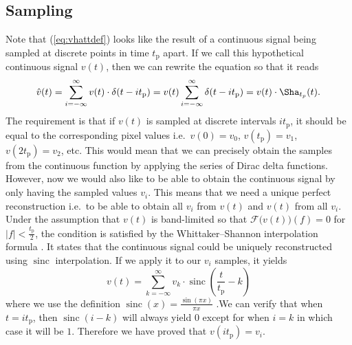 \documentclass[a4paper,12pt,twoside,openright]{report}
\begin{document}
\subsection{Sampling}
Note that (\ref{eq:vhattdef}) looks like the result of a continuous signal being sampled at discrete points in time $t_\text{p}$ apart. If we call this hypothetical continuous signal $v(t)$, then we can rewrite the equation so that it reads
\begin{equation}
\hat{v}(t) = \sum\limits_{i=-\infty}^{\infty} v(t) \cdot \delta(t-i t_\text{p}) = v(t) \sum\limits_{i=-\infty}^{\infty} \delta(t-i t_\text{p}) = v(t) \cdot \Sha_{t_{p}}(t) .
\end{equation}
The requirement is that if $v(t)$ is sampled at discrete intervals $i t_\text{p}$, it should be equal to the corresponding pixel values i.e.\  $v(0)=v_{0}$, $v(t_\text{p})=v_{1}$, $v(2 t_\text{p})=v_{2}$, etc. This would mean that we can precisely obtain the samples from the continuous function by applying the series of Dirac delta functions. However, now we would also like to be able to obtain the continuous signal by only having the sampled values $v_{i}$\@. This means that we need a unique perfect reconstruction i.e.\  to be able to obtain all $v_{i}$ from $v(t)$ and $v(t)$ from all $v_{i}$. Under the assumption that $v(t)$ is band-limited so that $\mathcal{F}\big( v(t) \big)(f) = 0$ for $|f| < \frac{t_\text{p}}{2}$, the condition is satisfied by the Whittaker--Shannon interpolation formula \cite{shannon1949communication}. It states that the continuous signal could be uniquely reconstructed using $\operatorname{sinc}$ interpolation. If we apply it to our $v_{i}$ samples, it yields
\begin{equation}
v(t) = \sum\limits_{k=-\infty}^{\infty} v_{k} \cdot \operatorname{sinc} \left( \frac{t}{t_\text{p}} - k \right)
\end{equation}
where we use the definition $ \operatorname{sinc}(x) = \frac{\sin(\pi x)}{\pi x}$ .We can verify that when $t=i t_\text{p}$, then $\operatorname{sinc}(i-k)$ will always yield $0$ except for when $i = k$ in which case it will be $1$. Therefore we have proved that $v(i t_\text{p}) = v_{i}$.
\end{document}
